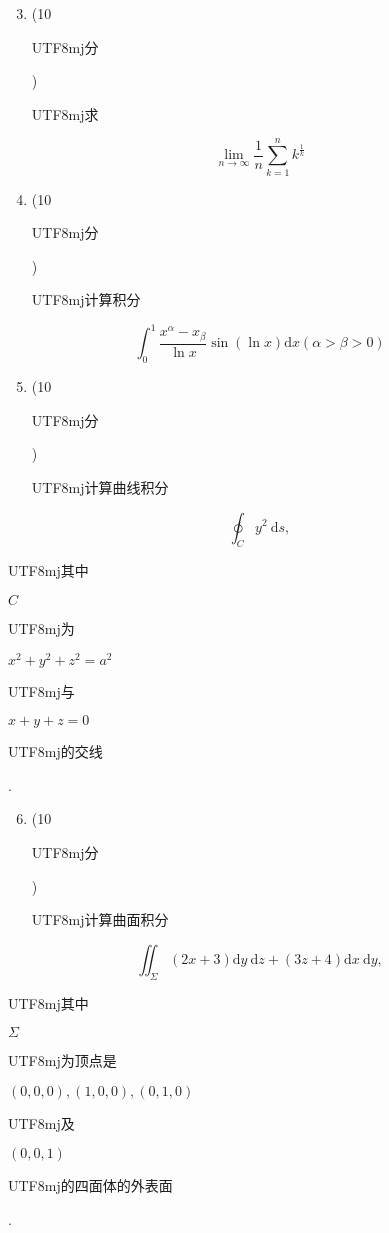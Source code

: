 \documentclass[10pt]{article}
\begin{document}
\begin{enumerate}
  \setcounter{enumi}{2}
  \item (10 \begin{CJK}{UTF8}{mj}分\end{CJK}) \begin{CJK}{UTF8}{mj}求\end{CJK}
\end{enumerate}
$$
\lim _{n \rightarrow \infty} \frac{1}{n} \sum_{k=1}^{n} k^{\frac{1}{k}}
$$

\begin{enumerate}
  \setcounter{enumi}{3}
  \item (10 \begin{CJK}{UTF8}{mj}分\end{CJK}) \begin{CJK}{UTF8}{mj}计算积分\end{CJK}
\end{enumerate}
$$
\int_{0}^{1} \frac{x^{\alpha}-x_{\beta}}{\ln x} \sin (\ln x) \mathrm{d} x(\alpha>\beta>0)
$$

\begin{enumerate}
  \setcounter{enumi}{4}
  \item (10 \begin{CJK}{UTF8}{mj}分\end{CJK}) \begin{CJK}{UTF8}{mj}计算曲线积分\end{CJK}
\end{enumerate}
$$
\oint_{C} y^{2} \mathrm{~d} s,
$$
\begin{CJK}{UTF8}{mj}其中\end{CJK} $C$ \begin{CJK}{UTF8}{mj}为\end{CJK} $x^{2}+y^{2}+z^{2}=a^{2}$ \begin{CJK}{UTF8}{mj}与\end{CJK} $x+y+z=0$ \begin{CJK}{UTF8}{mj}的交线\end{CJK}.

\begin{enumerate}
  \setcounter{enumi}{5}
  \item (10 \begin{CJK}{UTF8}{mj}分\end{CJK}) \begin{CJK}{UTF8}{mj}计算曲面积分\end{CJK}
\end{enumerate}
$$
\iint_{\Sigma}(2 x+3) \mathrm{d} y \mathrm{~d} z+(3 z+4) \mathrm{d} x \mathrm{~d} y,
$$
\begin{CJK}{UTF8}{mj}其中\end{CJK} $\Sigma$ \begin{CJK}{UTF8}{mj}为顶点是\end{CJK} $(0,0,0),(1,0,0),(0,1,0)$ \begin{CJK}{UTF8}{mj}及\end{CJK} $(0,0,1)$ \begin{CJK}{UTF8}{mj}的四面体的外表面\end{CJK}.
\end{document}
